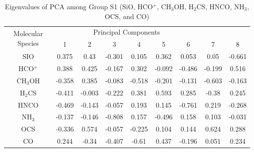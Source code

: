 \documentclass{aa}
\begin{document}
\begin{CJK*}{UTF8}{gbsn}
    \begin{table}[htbp]
        \centering
        \begin{tabular}{ccccccccc}
        \hline\hline
        \multirow{2}{*}{Molecular Species} & \multicolumn{6}{c}{Principal Components}                 \\ \cline{2-9} 
                                           & 1       & 2       & 3       & 4       & 5      & 6      &7   &8 \\ \hline
        SIO   & 0.375  & 0.43   & -0.301 & 0.105  & 0.362  & 0.053  & 0.05   & -0.661  \\ \hline
        HCO$^+$   & 0.388  & 0.425  & -0.167 & 0.302  & -0.092 & -0.486 & -0.199 & 0.516  \\ \hline
        CH$_3$OH & -0.358 & 0.385  & -0.083 & -0.518 & -0.201 & -0.131 & -0.603 & -0.163 \\ \hline
        H$_2$CS  & -0.411 & -0.003 & -0.222 & 0.381  & 0.593  & 0.285  & -0.38  & 0.245 \\ \hline
        HNCO  & -0.469 & -0.143 & -0.057 & 0.193  & 0.145  & -0.761 & 0.219  & -0.268 \\ \hline
        NH$_3$   & -0.137 & -0.146 & -0.808 & 0.157  & -0.496 & 0.158  & 0.103  & -0.031 \\ \hline
        OCS   & -0.336 & 0.574  & -0.057 & -0.225 & 0.104  & 0.144  & 0.624  & 0.288  \\ \hline
        CO    & 0.244  & -0.34  & -0.407 & -0.61  & 0.437  & -0.196 & 0.051  & 0.234 \\ \hline\hline
        \end{tabular}
        \caption{Eigenvalues of PCA among Group S1 (SiO, HCO$^+$, CH$_3$OH, H$_2$CS, HNCO, NH$_3$, OCS, and CO)}
        \label{table-shock-1-eigen}
    \end{table}



\end{CJK*}
\end{document}
